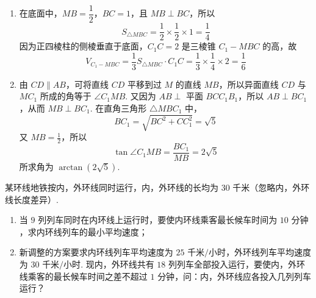 \begin{solution}
\begin{enumerate}
\item 在底面中，\(MB=\dfrac12\)，\(BC=1\)，且 \(MB\perp BC\)，所以
\[
S_{\triangle MBC}=\frac12\times\frac12\times1=\frac14
\]
因为正四棱柱的侧棱垂直于底面，\(C_1C=2\) 是三棱锥 \(C_1-MBC\) 的高，故
\[
V_{C_1-MBC}=\frac13S_{\triangle MBC}\cdot C_1C=\frac13\times\frac14\times2=\frac16
\]

\item 由 \(CD\parallel AB\)，可将直线 \(CD\) 平移到过 \(M\) 的直线 \(MB\)，所以异面直线 \(CD\) 与 \(MC_1\) 所成的角等于 \(\angle C_1MB\). 又因为 \(AB\perp\) 平面 \(BCC_1B_1\)，所以 \(AB\perp BC_1\)，从而 \(MB\perp BC_1\). 在直角三角形 \(\triangle MBC_1\) 中，
\[
BC_1=\sqrt{BC^2+CC_1^2}=\sqrt5
\]
又 \(MB=\frac12\)，所以
\[
\tan\angle C_1MB=\frac{BC_1}{MB}=2\sqrt5
\]
所求角为 \(\arctan(2\sqrt5)\).
\end{enumerate}
\end{solution}

\begin{problem}
某环线地铁按内，外环线同时运行，内，外环线的长均为 \(30\text{ 千米}\)（忽略内，外环线长度差异）.

\begin{enumerate}
\item 当 \(9\) 列列车同时在内环线上运行时，要使内环线乘客最长候车时间为 \(10\text{ 分钟}\)，求内环线列车的最小平均速度；
\item 新调整的方案要求内环线列车平均速度为 \(25\text{ 千米/小时}\)，外环线列车平均速度为 \(30\text{ 千米/小时}\). 现内，外环线共有 \(18\) 列列车全部投入运行，要使内，外环线乘客的最长候车时间之差不超过 \(1\text{ 分钟}\)，问：内，外环线应各投入几列列车运行？
\end{enumerate}
\end{problem}

